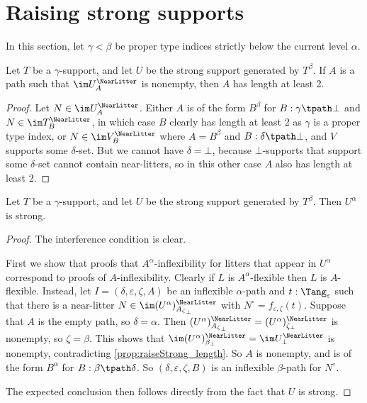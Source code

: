 \section{Raising strong supports}
In this section, let \( \gamma < \beta \) be proper type indices strictly below the current level \( \alpha \).
\begin{proposition}
  \label{prop:raiseStrong_length}
  Let \( T \) be a \( \gamma \)-support, and let \( U \) be the strong support generated by \( T^\beta \).
  If \( A \) is a path such that \( \im U_A^\NearLitter \) is nonempty, then \( A \) has length at least 2.
\end{proposition}
\begin{proof}
  Let \( N \in \im U_A^\NearLitter \).
  Either \( A \) is of the form \( B^\beta \) for \( B : \gamma \tpath \bot \) and \( N \in \im T_B^\NearLitter \), in which case \( B \) clearly has length at least 2 as \( \gamma \) is a proper type index, or \( N \in \im V_B^\NearLitter \) where \( A = B^\beta \) and \( B : \delta \tpath \bot \), and \( V \) supports some \( \delta \)-set.
  But we cannot have \( \delta = \bot \), because \( \bot \)-supports that support some \( \delta \)-set cannot contain near-litters, so in this other case \( A \) also has length at least 2.
\end{proof}
\begin{proposition}
  \label{prop:raiseStrong}
  Let \( T \) be a \( \gamma \)-support, and let \( U \) be the strong support generated by \( T^\beta \).
  Then \( U^\alpha \) is strong.
\end{proposition}
\begin{proof}
  The interference condition is clear.

  First we show that proofs that \( A^\alpha \)-inflexibility for litters that appear in \( U^\alpha \) correspond to proofs of \( A \)-inflexibility.
  Clearly if \( L \) is \( A^\alpha \)-flexible then \( L \) is \( A \)-flexible.
  Instead, let \( I = (\delta, \varepsilon, \zeta, A) \) be an inflexible \( \alpha \)-path and \( t : \Tang_\varepsilon \) such that there is a near-litter \( N \in \im (U^\alpha)^\NearLitter_{{A_\zeta}_\bot} \) with \( N^\circ = f_{\varepsilon,\zeta}(t) \).
  Suppose that \( A \) is the empty path, so \( \delta = \alpha \).
  Then \( (U^\alpha)^\NearLitter_{{A_\zeta}_\bot} = (U^\alpha)^\NearLitter_{\zeta_\bot} \) is nonempty, so \( \zeta = \beta \).
  This shows that \( \im (U^\alpha)^\NearLitter_{\beta_\bot} = \im U^\NearLitter_\bot \) is nonempty, contradicting \cref{prop:raiseStrong_length}.
  So \( A \) is nonempty, and is of the form \( B^\alpha \) for \( B : \beta \tpath \delta \).
  So \( (\delta,\varepsilon,\zeta,B) \) is an inflexible \( \beta \)-path for \( N^\circ \).

  The expected conclusion then follows directly from the fact that \( U \) is strong.
\end{proof}
